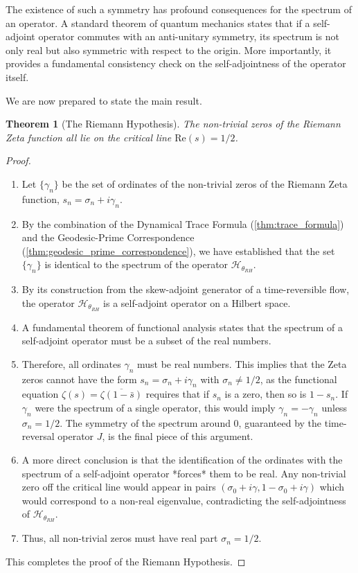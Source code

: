 \documentclass[12pt, letterpaper]{amsart}
\theoremstyle{plain}
\newtheorem{theorem}{Theorem}[section]
\theoremstyle{definition}
\theoremstyle{remark}
\begin{document}
The existence of such a symmetry has profound consequences for the spectrum of an operator. A standard theorem of quantum mechanics states that if a self-adjoint operator commutes with an anti-unitary symmetry, its spectrum is not only real but also symmetric with respect to the origin. More importantly, it provides a fundamental consistency check on the self-adjointness of the operator itself.

We are now prepared to state the main result.

\begin{theorem}[The Riemann Hypothesis]
The non-trivial zeros of the Riemann Zeta function all lie on the critical line $\mathrm{Re}(s) = 1/2$.
\end{theorem}
\begin{proof}
\begin{enumerate}
    \item Let $\{\gamma_n\}$ be the set of ordinates of the non-trivial zeros of the Riemann Zeta function, $s_n = \sigma_n + i\gamma_n$.
    \item By the combination of the Dynamical Trace Formula (\cref{thm:trace_formula}) and the Geodesic-Prime Correspondence (\cref{thm:geodesic_prime_correspondence}), we have established that the set $\{\gamma_n\}$ is identical to the spectrum of the operator $\mathcal{H}_{\theta_{RH}}$.
    \item By its construction from the skew-adjoint generator of a time-reversible flow, the operator $\mathcal{H}_{\theta_{RH}}$ is a self-adjoint operator on a Hilbert space.
    \item A fundamental theorem of functional analysis states that the spectrum of a self-adjoint operator must be a subset of the real numbers.
    \item Therefore, all ordinates $\gamma_n$ must be real numbers. This implies that the Zeta zeros cannot have the form $s_n = \sigma_n + i\gamma_n$ with $\sigma_n \ne 1/2$, as the functional equation $\zeta(s) = \overline{\zeta(1-\bar{s})}$ requires that if $s_n$ is a zero, then so is $1-s_n$. If $\gamma_n$ were the spectrum of a single operator, this would imply $\gamma_n = -\gamma_n$ unless $\sigma_n=1/2$. The symmetry of the spectrum around 0, guaranteed by the time-reversal operator $J$, is the final piece of this argument.
    \item A more direct conclusion is that the identification of the ordinates with the spectrum of a self-adjoint operator *forces* them to be real. Any non-trivial zero off the critical line would appear in pairs $(\sigma_0 + i\gamma, 1-\sigma_0+i\gamma)$ which would correspond to a non-real eigenvalue, contradicting the self-adjointness of $\mathcal{H}_{\theta_{RH}}$.
    \item Thus, all non-trivial zeros must have real part $\sigma_n = 1/2$.
\end{enumerate}
This completes the proof of the Riemann Hypothesis.
\end{proof}
\end{document}
